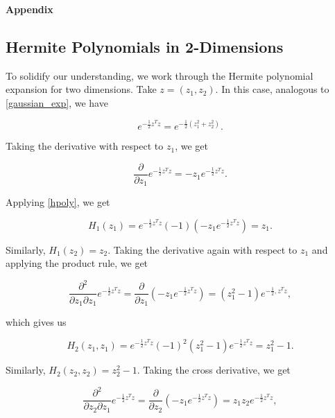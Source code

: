 \documentclass[11pt]{article}
\numberwithin{equation}{section}
\begin{document}
\pagebreak 

\textbf{Appendix} \label{app:hermite2d}

\begin{appendix}

\section{Hermite Polynomials in 2-Dimensions} \label{app:hermite2d}

To solidify our understanding, we work through the Hermite polynomial expansion for two dimensions. Take $z = (z_1, z_2)$. In this case, analogous to \eqref{gaussian_exp}, we have

\begin{equation}
e^{-\frac{1}{2} z^T z} = e^{-\frac{1}{2} (z_1^2 + z_2^2)}.
\end{equation}

Taking the derivative with respect to $z_1$, we get

\begin{equation*}
\frac{\partial}{\partial z_1} e^{-\frac{1}{2} z^T z} = -z_1 e^{-\frac{1}{2} z^T z}.
\end{equation*}

Applying \eqref{hpoly}, we get

\begin{equation}
H_1(z_1) = e^{-\frac{1}{2} z^T z} (-1) \left( -z_1 e^{-\frac{1}{2} z^T z} \right) = z_1.
\end{equation}

Similarly, $H_1(z_2) = z_2$. Taking the derivative again with respect to $z_1$ and applying the product rule, we get

\begin{equation*}
\frac{\partial^2}{\partial z_1 \partial z_1} e^{-\frac{1}{2} z^T z} = \frac{\partial}{\partial z_1} \left( -z_1 e^{-\frac{1}{2} z^T z} \right) = \left( z_1^2 - 1 \right) e^{-\frac{1}{2}, z^T z},
\end{equation*}

which gives us

\begin{equation}
H_2(z_1, z_1) = e^{-\frac{1}{2} z^T z} (-1)^2 (z_1^2 -1) e^{-\frac{1}{2} z^T z} = z_1^2 -1.
\end{equation}

Similarly, $H_2(z_2, z_2) = z_2^2 -1$. Taking the cross derivative, we get

\begin{equation*}
\frac{\partial^2}{\partial z_2 \partial z_1} e^{-\frac{1}{2} z^T z} = \frac{\partial}{\partial z_2} \left( -z_1 e^{-\frac{1}{2} z^T z} \right) =  z_1 z_2  e^{-\frac{1}{2} z^T z},
\end{equation*}


\end{appendix}
\end{document}
